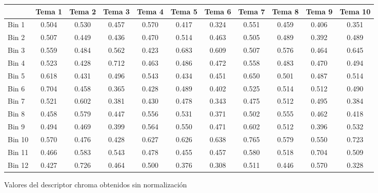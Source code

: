 \documentclass[]{article}
\makeatletter
\newcommand{\tabla}[4]{
\begin{tablehere}
\begin{center}
\begin{tabular}{#1}
#2
\end{tabular}
\caption{#3}
\label{#4}
\end{center}
\end{tablehere}
}
\newenvironment{tablehere}    %
  {\def\@captype{table}}    %

  {}              %
\makeatother
\begin{document}
\tabla
{|l|c|c|c|c|c|c|c|c|c|c|}
{
\hline
 &Tema 1 & Tema 2 & Tema 3 & Tema 4 & Tema 5 & Tema 6 & Tema 7 & Tema 8 & Tema 9 & Tema 10 \\
\hline
Bin 1 & 0.504 & 0.530 & 0.457 & 0.570 & 0.417 & 0.324 & 0.551 & 0.459 & 0.406 & 0.351 \\
\hline
Bin 2 & 0.507 & 0.449 & 0.436 & 0.470 & 0.514 & 0.463 & 0.505 & 0.489 & 0.392 & 0.489 \\
\hline
Bin 3 & 0.559 & 0.484 & 0.562 & 0.423 & 0.683 & 0.609 & 0.507 & 0.576 & 0.464 & 0.645 \\
\hline
Bin 4 & 0.523 & 0.428 & 0.712 & 0.463 & 0.486 & 0.472 & 0.558 & 0.483 & 0.470 & 0.494 \\
\hline
Bin 5 & 0.618 & 0.431 & 0.496 & 0.543 & 0.434 & 0.451 & 0.650 & 0.501 & 0.487 & 0.514 \\
\hline
Bin 6 & 0.704 & 0.458 & 0.365 & 0.428 & 0.489 & 0.402 & 0.525 & 0.514 & 0.512 & 0.490 \\
\hline
Bin 7 & 0.521 & 0.602 & 0.381 & 0.430 & 0.478 & 0.343 & 0.475 & 0.512 & 0.495 & 0.384 \\
\hline
Bin 8 & 0.458 & 0.579 & 0.447 & 0.556 & 0.531 & 0.371 & 0.502 & 0.555 & 0.462 & 0.418 \\
\hline
Bin 9 & 0.494 & 0.469 & 0.399 & 0.564 & 0.550 & 0.471 & 0.602 & 0.512 & 0.396 & 0.532 \\
\hline
Bin 10 & 0.570 & 0.476 & 0.428 & 0.627 & 0.626 & 0.638 & 0.765 & 0.579 & 0.550 & 0.723 \\
\hline
Bin 11 & 0.466 & 0.583 & 0.543 & 0.478 & 0.455 & 0.457 & 0.580 & 0.518 & 0.704 & 0.509 \\
\hline
Bin 12 & 0.427 & 0.726 & 0.464 & 0.500 & 0.376 & 0.308 & 0.511 & 0.446 & 0.570 & 0.328 \\
\hline
}
{Valores del descriptor chroma obtenidos sin normalización}
{tab: chroma}
\end{document}
